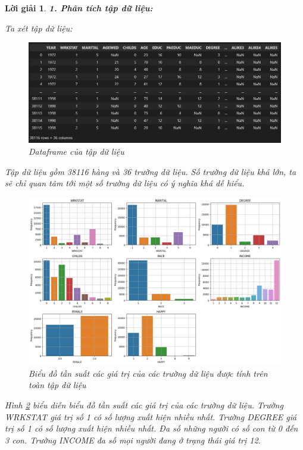 \documentclass[14pt, a4paper]{article}
\theoremstyle{sltheorem}
\theoremstyle{soltheorem}
\newtheorem*{loigiai}{Lời giải}
\begin{document}
\begin{loigiai}

    \textbf{1. Phân tích tập dữ liệu:}

    Ta xét tập dữ liệu:

    \begin{figure}[H]
        \centering
        \includegraphics[width=0.8\linewidth]{figures/overall_df.png}
        \caption{Dataframe của tập dữ liệu}
        \label{fig:overall_df}
    \end{figure}

    Tập dữ liệu gồm 38116 hàng và 36 trường dữ liệu.
    Số trường dữ liệu khá lớn, ta sẽ chỉ quan tâm tới một số trường dữ liệu có ý nghĩa khá dễ hiểu.

    \begin{figure}[H]
        \centering
        \includegraphics[width=0.6\linewidth]{figures/overall_frequency.png}
        \caption{Biểu đồ tần suất các giá trị của các trường dữ liệu được tính trên toàn tập dữ liệu}
        \label{fig:overall_frequency}
    \end{figure}

    Hình \ref{fig:overall_frequency} biểu diễn biểu đồ tần suất các giá trị của các trường dữ liệu.
    Trường WRKSTAT giá trị số 1 có số lượng xuất hiện nhiều nhất.
    Trường DEGREE giá trị số 1 có số lượng xuất hiện nhiều nhất.
    Đa số những người có số con từ 0 đến 3 con.
    Trường INCOME đa số mọi người đang ở trạng thái giá trị 12.


\end{loigiai}
\end{document}

